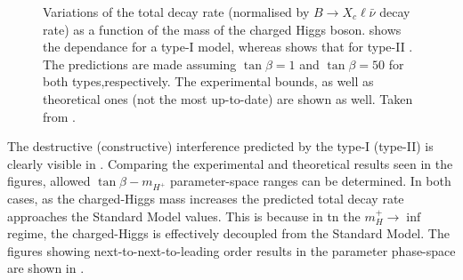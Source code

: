 \begin{figure}[htbp!]
    \centering
    \caption{\label{fig:xsgamma_br_2hdm} 
    Variations of the \BtoXsgamma total decay rate (normalised by $B\rightarrow X_c \ell\bar{\nu}$ decay rate) as a function of the mass of the charged Higgs boson.
     shows the dependance for a type-I \TwoHDM model, whereas  shows that for type-II \TwoHDM.
    The predictions are made assuming $\tan\beta=1$ and $\tan\beta=50$ for both types,respectively.
    The experimental bounds, as well as theoretical ones (not the most up-to-date) are shown as well.
    Taken from \cite{Misiak:2017bgg}.}
\end{figure}


The destructive (constructive) interference predicted by the type-I (type-II)  is clearly visible in .
Comparing the experimental and theoretical results seen in the figures, allowed $\tan\beta-m_{H^+}$ parameter-space ranges can be determined.
In both cases, as the charged-Higgs mass increases the predicted total decay rate approaches the Standard Model values.
This is because in tn the $m_H^+\rightarrow\inf$ regime, the charged-Higgs is effectively decoupled from the Standard Model.
The figures showing next-to-next-to-leading order results in the parameter phase-space are shown in .

